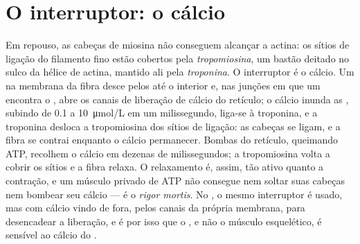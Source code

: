 \section{O interruptor: o cálcio}

\begin{proposition}\label{prop:b2:muscle-movement:coupling}
Em repouso, as cabeças de miosina não conseguem alcançar a actina: os
sítios de ligação do filamento fino estão cobertos pela
\emph{tropomiosina}, um bastão deitado no sulco da hélice de actina,
mantido ali pela \emph{troponina}. O interruptor é o cálcio. Um
 na membrana da fibra desce pelos  até o
interior e, nas junções em que um  encontra o , abre os canais de liberação de cálcio do retículo; o
cálcio inunda as , subindo de \qty{0.1}{} a
\qty{10}{\micro mol/L} em um milissegundo, liga-se à troponina, e a
troponina desloca a tropomiosina dos sítios de ligação: as cabeças se
ligam, e a fibra se contrai enquanto o cálcio permanecer. Bombas do
retículo, queimando ATP, recolhem o cálcio em dezenas de
milissegundos; a tropomiosina volta a cobrir os sítios e a fibra relaxa.
O relaxamento é, assim, tão ativo quanto a contração, e um músculo
privado de ATP não consegue nem soltar suas cabeças nem bombear seu
cálcio --- é o \textit{rigor mortis}. No , o mesmo interruptor é
usado, mas com cálcio vindo de fora, pelos canais da própria membrana,
para desencadear a liberação, e é por isso que o , e não o
músculo esquelético, é sensível ao cálcio do .
\end{proposition}

